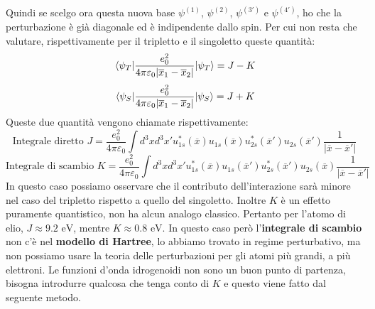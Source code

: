 Quindi se scelgo ora questa nuova base $\psi^{(1)}$, $\psi^{(2)}$, $\psi^{(3')}$ e $\psi^{(4')}$, ho che la perturbazione è già diagonale ed è indipendente dallo spin. Per cui non resta che valutare, rispettivamente per il tripletto e il singoletto queste quantità:
\begin{equation*}
    \mel{\psi_T}{\frac{e_0^2}{4\pi\varepsilon_0|\overline{x}_1-\overline{x}_2|}}{\psi_T} = J - K
\end{equation*}
\begin{equation*}
    \mel{\psi_S}{\frac{e_0^2}{4\pi\varepsilon_0|\overline{x}_1-\overline{x}_2|}}{\psi_S} = J + K
\end{equation*}
Queste due quantità vengono chiamate rispettivamente:
\begin{equation*}
    \text{Integrale diretto } J = \frac{e_0^2}{4\pi\varepsilon_0}\int d^3x d^3x'u_{1s}^*(\overline x)u_{1s}(\overline x)u_{2s}^*(\overline{x}')u_{2s}(\overline{x}')\frac{1}{|\overline x - \overline{x}'|}
\end{equation*}
\begin{equation*}
    \text{Integrale di scambio } K = \frac{e_0^2}{4\pi\varepsilon_0}\int d^3x d^3x'u_{1s}^*(\overline x)u_{1s}(\overline{x}')u_{2s}^*(\overline{x}')u_{2s}(\overline{x})\frac{1}{|\overline x - \overline{x}'|}
\end{equation*}
In questo caso possiamo osservare che il contributo dell'interazione sarà minore nel caso del tripletto rispetto a quello del singoletto. Inoltre $K$ è un effetto puramente quantistico, non ha alcun analogo classico.
Pertanto per l'atomo di elio, $J\approx 9.2 \text{ eV}$, mentre $K \approx 0.8 \text{ eV}$. In questo caso però l'\textbf{integrale di scambio} non c'è nel \textbf{modello di Hartree}, lo abbiamo trovato in regime perturbativo, ma non possiamo usare la teoria delle perturbazioni per gli atomi più grandi, a più elettroni. Le funzioni d'onda idrogenoidi non sono un buon punto di partenza, bisogna introdurre qualcosa che tenga conto di $K$ e questo viene fatto dal seguente metodo.